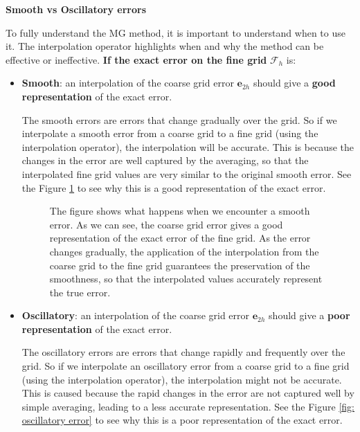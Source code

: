 \newpage

\begin{flushleft}
    \textcolor{Green3}{ \textbf{Smooth vs Oscillatory errors}}
\end{flushleft}
To fully understand the MG method, it is important to understand when to use it. The interpolation operator highlights when and why the method can be effective or ineffective. \textbf{If the exact error on the fine grid} $\mathcal{F}_{h}$ is:
\begin{itemize}
    \item[\textcolor{Green3}{\faIcon{check-circle}}] \textcolor{Green3}{\textbf{Smooth}}: an interpolation of the coarse grid error $\mathbf{e}_{2h}$ should give a \textbf{good representation} of the exact error.
    
    The smooth errors are errors that change gradually over the grid. So if we interpolate a smooth error from a coarse grid to a fine grid (using the interpolation operator), the interpolation will be accurate. This is because the changes in the error are well captured by the averaging, so that the interpolated fine grid values are very similar to the original smooth error. See the Figure \ref{fig: smooth error} to see why this is a good representation of the exact error.
    
    \begin{figure}[!htp]
    	\centering
    	\resizebox{.9\textwidth}{!}{}
    	\caption{The figure shows what happens when we encounter a smooth error. As we can see, the coarse grid error gives a good representation of the exact error of the fine grid. As the error changes gradually, the application of the interpolation from the coarse grid to the fine grid guarantees the preservation of the smoothness, so that the interpolated values accurately represent the true error.}
    	\label{fig: smooth error}
    \end{figure}
    
    \newpage
    
    \item[\textcolor{Red2}{\faIcon{times-circle}}] \textcolor{Red2}{\textbf{Oscillatory}}: an interpolation of the coarse grid error $\mathbf{e}_{2h}$ should give a \textbf{poor representation} of the exact error.
    
    The oscillatory errors are errors that change rapidly and frequently over the grid. So if we interpolate an oscillatory error from a coarse grid to a fine grid (using the interpolation operator), the interpolation might not be accurate. This is caused because the rapid changes in the error are not captured well by simple averaging, leading to a less accurate representation. See the Figure \ref{fig: oscillatory error} to see why this is a poor representation of the exact error.
    

\end{itemize}
